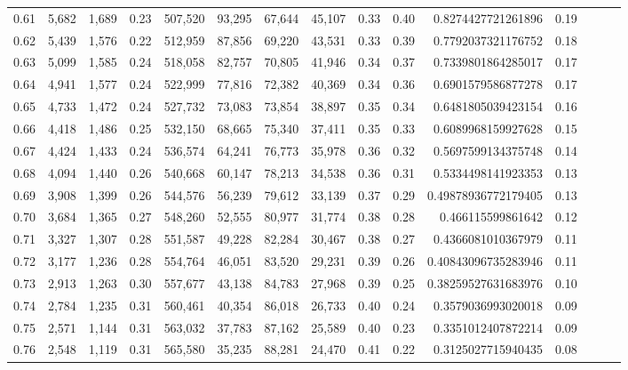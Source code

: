 \begin{tabular}{rrrrrrrrrrrrrrr}
0.61 &   5,682 &  1,689 &  0.23 &  507,520 &   93,295 &   67,644 &   45,107 &  0.33 &  0.40 &    0.8274427721261896 &      0.19 \\
0.62 &   5,439 &  1,576 &  0.22 &  512,959 &   87,856 &   69,220 &   43,531 &  0.33 &  0.39 &    0.7792037321176752 &      0.18 \\
0.63 &   5,099 &  1,585 &  0.24 &  518,058 &   82,757 &   70,805 &   41,946 &  0.34 &  0.37 &    0.7339801864285017 &      0.17 \\
0.64 &   4,941 &  1,577 &  0.24 &  522,999 &   77,816 &   72,382 &   40,369 &  0.34 &  0.36 &    0.6901579586877278 &      0.17 \\
0.65 &   4,733 &  1,472 &  0.24 &  527,732 &   73,083 &   73,854 &   38,897 &  0.35 &  0.34 &    0.6481805039423154 &      0.16 \\
0.66 &   4,418 &  1,486 &  0.25 &  532,150 &   68,665 &   75,340 &   37,411 &  0.35 &  0.33 &    0.6089968159927628 &      0.15 \\
0.67 &   4,424 &  1,433 &  0.24 &  536,574 &   64,241 &   76,773 &   35,978 &  0.36 &  0.32 &    0.5697599134375748 &      0.14 \\
0.68 &   4,094 &  1,440 &  0.26 &  540,668 &   60,147 &   78,213 &   34,538 &  0.36 &  0.31 &    0.5334498141923353 &      0.13 \\
0.69 &   3,908 &  1,399 &  0.26 &  544,576 &   56,239 &   79,612 &   33,139 &  0.37 &  0.29 &   0.49878936772179405 &      0.13 \\
0.70 &   3,684 &  1,365 &  0.27 &  548,260 &   52,555 &   80,977 &   31,774 &  0.38 &  0.28 &     0.466115599861642 &      0.12 \\
0.71 &   3,327 &  1,307 &  0.28 &  551,587 &   49,228 &   82,284 &   30,467 &  0.38 &  0.27 &    0.4366081010367979 &      0.11 \\
0.72 &   3,177 &  1,236 &  0.28 &  554,764 &   46,051 &   83,520 &   29,231 &  0.39 &  0.26 &   0.40843096735283946 &      0.11 \\
0.73 &   2,913 &  1,263 &  0.30 &  557,677 &   43,138 &   84,783 &   27,968 &  0.39 &  0.25 &   0.38259527631683976 &      0.10 \\
0.74 &   2,784 &  1,235 &  0.31 &  560,461 &   40,354 &   86,018 &   26,733 &  0.40 &  0.24 &    0.3579036993020018 &      0.09 \\
0.75 &   2,571 &  1,144 &  0.31 &  563,032 &   37,783 &   87,162 &   25,589 &  0.40 &  0.23 &    0.3351012407872214 &      0.09 \\
0.76 &   2,548 &  1,119 &  0.31 &  565,580 &   35,235 &   88,281 &   24,470 &  0.41 &  0.22 &    0.3125027715940435 &      0.08 \\

\end{tabular}
